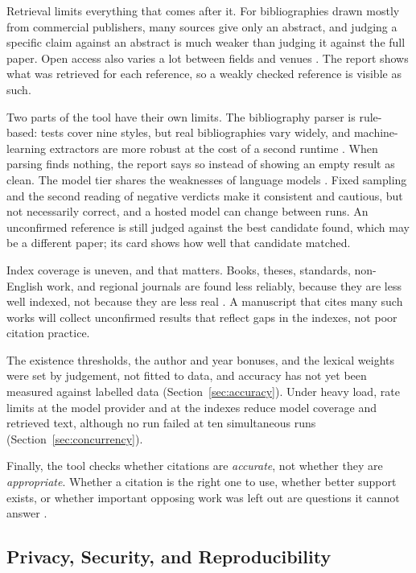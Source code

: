 \documentclass{article}
\begin{document}
Retrieval limits everything that comes after it. For bibliographies drawn mostly from commercial publishers, many sources give only an abstract, and judging a specific claim against an abstract is much weaker than judging it against the full paper. Open access also varies a lot between fields and venues \cite{piwowar2018}. The report shows what was retrieved for each reference, so a weakly checked reference is visible as such.

Two parts of the tool have their own limits. The bibliography parser is rule-based: tests cover nine styles, but real bibliographies vary widely, and machine-learning extractors are more robust at the cost of a second runtime \cite{lopez2009,tkaczyk2015}. When parsing finds nothing, the report says so instead of showing an empty result as clean. The model tier shares the weaknesses of language models \cite{ji2023,liang2024}. Fixed sampling and the second reading of negative verdicts make it consistent and cautious, but not necessarily correct, and a hosted model can change between runs. An unconfirmed reference is still judged against the best candidate found, which may be a different paper; its card shows how well that candidate matched.

Index coverage is uneven, and that matters. Books, theses, standards, non-English work, and regional journals are found less reliably, because they are less well indexed, not because they are less real \cite{bornmann2015}. A manuscript that cites many such works will collect unconfirmed results that reflect gaps in the indexes, not poor citation practice.

The existence thresholds, the author and year bonuses, and the lexical weights were set by judgement, not fitted to data, and accuracy has not yet been measured against labelled data (Section~\ref{sec:accuracy}). Under heavy load, rate limits at the model provider and at the indexes reduce model coverage and retrieved text, although no run failed at ten simultaneous runs (Section~\ref{sec:concurrency}).

Finally, the tool checks whether citations are \emph{accurate}, not whether they are \emph{appropriate}. Whether a citation is the right one to use, whether better support exists, or whether important opposing work was left out are questions it cannot answer \cite{hicks2015,jurgens2018}.

\subsection{Privacy, Security, and Reproducibility}
\label{sec:privacy}
\end{document}
